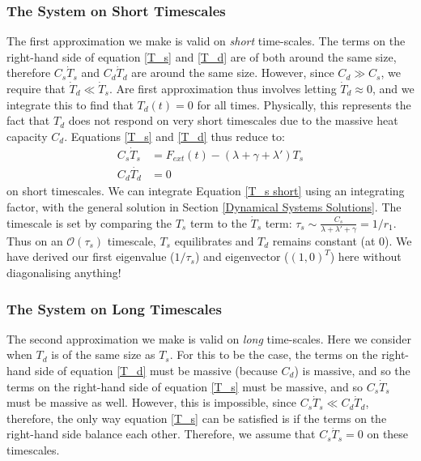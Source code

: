 \subsubsection{The System on Short Timescales}

The first approximation we make is valid on \textit{short} time-scales. The terms on the right-hand side of equation \ref{T_s} and \ref{T_d} are of both around the same size, therefore $C_s\dot T_s$ and $C_d\dot T_d$ are around the same size. However, since $C_d\gg C_s$, we require that $\dot T_d\ll \dot T_s$. Are first approximation thus involves letting $\dot T_d\approx0$, and we integrate this to find that $T_d(t)=0$ for all times. Physically, this represents the fact that $T_d$ does not respond on very short timescales due to the massive heat capacity $C_d$. Equations \ref{T_s} and \ref{T_d} thus reduce to:
\begin{align}
    \label{T_s short}
    C_s\dot T_s &=F_{ext}(t)-(\lambda +\gamma+ \lambda')T_s\\ 
    \label{T_d short}
    C_d \dot{T_d} &= 0
\end{align}
on short timescales. We can integrate Equation \ref{T_s short} using an integrating factor, with the general solution in Section \ref{Dynamical Systems Solutions}. The timescale is set by comparing the $T_s$ term to the $\dot T_s$ term: $\tau_s\sim \frac{C_s}{\lambda+\lambda'+\gamma}=1/r_1$. Thus on an $\mathcal{O}(\tau_s)$ timescale, $T_s$ equilibrates and $T_d$ remains constant (at $0$). We have derived our first eigenvalue ($1/\tau_s$) and eigenvector ($(1,0)^T$) here without diagonalising anything!

\subsubsection{The System on Long Timescales}

The second approximation we make is valid on \textit{long} time-scales. Here we consider when $T_d$ is of the same size as $T_s$. For this to be the case, the terms on the right-hand side of equation \ref{T_d} must be massive (because $C_d$) is massive, and so the terms on the right-hand side of equation \ref{T_s} must be massive, and so $C_s \dot T_s$ must be massive as well. However, this is impossible, since $C_s \dot T_s \ll C_d \dot T_d$, therefore, the only way equation \ref{T_s} can be satisfied is if the terms on the right-hand side balance each other. Therefore, we assume that  $C_s \dot T_s=0$ on these timescales.

